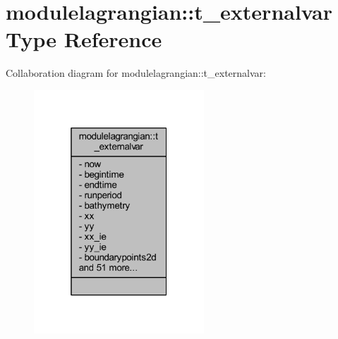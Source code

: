 \hypertarget{structmodulelagrangian_1_1t__externalvar}{}\section{modulelagrangian\+:\+:t\+\_\+externalvar Type Reference}
\label{structmodulelagrangian_1_1t__externalvar}


Collaboration diagram for modulelagrangian\+:\+:t\+\_\+externalvar\+:\nopagebreak
\begin{figure}[H]
\begin{center}
\leavevmode
\includegraphics[width=181pt]{structmodulelagrangian_1_1t__externalvar__coll__graph}
\end{center}
\end{figure}
